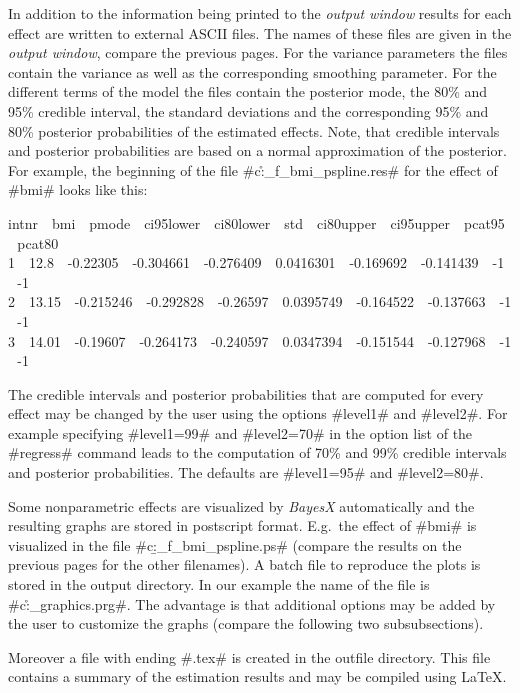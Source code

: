 In addition to the information being printed to the {\em output
window} results for each effect are written to external ASCII
files. The names of these files are given in the {\em output
window}, compare the previous pages. For the variance parameters
the files contain the variance as well as the corresponding
smoothing parameter. For the different terms of the model the
files contain the posterior mode, the 80\% and 95\% credible
interval, the standard deviations and the corresponding 95\% and
80\% posterior probabilities of the estimated effects. Note, that
credible intervals and posterior probabilities are based on a
normal approximation of the posterior. For example, the beginning
of the file #c:\data\r_f_bmi_pspline.res# for the effect of #bmi#
looks like this:

{\footnotesize
 intnr \,\, bmi \,\, pmode \,\, ci95lower \,\, ci80lower \,\, std \,\, ci80upper \,\, ci95upper \,\, pcat95 \,\, pcat80\\
 1 \,\, 12.8 \,\, -0.22305 \,\, -0.304661 \,\, -0.276409 \,\, 0.0416301 \,\, -0.169692 \,\, -0.141439 \,\, -1 \,\, -1\\
 2 \,\, 13.15 \,\, -0.215246 \,\, -0.292828 \,\, -0.26597 \,\, 0.0395749 \,\, -0.164522 \,\, -0.137663 \,\, -1 \,\, -1\\
 3 \,\, 14.01 \,\, -0.19607 \,\, -0.264173 \,\, -0.240597 \,\, 0.0347394 \,\, -0.151544 \,\, -0.127968 \,\, -1 \,\, -1}

The credible intervals and posterior probabilities that are
computed for every effect may be changed by the user using the
options #level1# and #level2#. For example specifying #level1=99#
and #level2=70# in the option list of the #regress# command leads
to the computation of 70\% and 99\% credible intervals and
posterior probabilities. The defaults are #level1=95# and
#level2=80#.

Some nonparametric effects are visualized by {\em BayesX}
automatically and the resulting graphs are stored in postscript format.
E.g.~the effect of #bmi# is visualized in the file
#c:\data\b_f_bmi_pspline.ps# (compare the results on the previous
pages for the other filenames). A batch file to reproduce the
plots is stored in the output directory. In our example the name
of the file is #c:\data\r_graphics.prg#. The advantage is that
additional options may be added by the user to customize the
graphs (compare the following two subsubsections).

Moreover a file with ending #.tex# is created in the outfile
directory. This file contains a summary of the estimation results
and may be compiled using \LaTeX.

